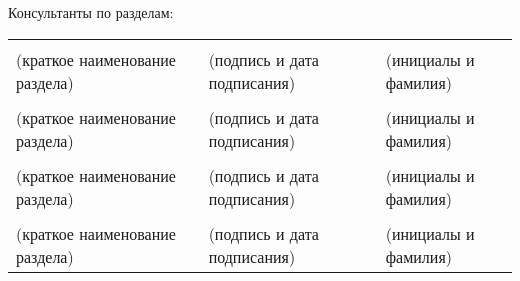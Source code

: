 \noindent
Консультанты по разделам: \\
\noindent
\begin{tabularx}{\linewidth}{@{}llYlY@{}}
    &&  &&  \\
    \footnotesize(краткое наименование раздела)\normalsize && \footnotesize(подпись и дата подписания)\normalsize && \footnotesize(инициалы и фамилия)\normalsize \\
    &&  &&  \\
    \footnotesize(краткое наименование раздела)\normalsize && \footnotesize(подпись и дата подписания)\normalsize && \footnotesize(инициалы и фамилия)\normalsize \\
    &&  &&  \\
    \footnotesize(краткое наименование раздела)\normalsize && \footnotesize(подпись и дата подписания)\normalsize && \footnotesize(инициалы и фамилия)\normalsize \\
    &&  &&  \\
    \footnotesize(краткое наименование раздела)\normalsize && \footnotesize(подпись и дата подписания)\normalsize && \footnotesize(инициалы и фамилия)\normalsize
\end{tabularx}


\newpage